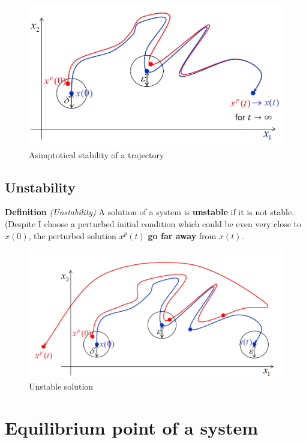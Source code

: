 \begin{figure}[h]
    \centering
    \includegraphics[scale=0.6]{NonLinearControl/images/AsStable.png}
    \caption{Asimptotical stability of a trajectory}
    \label{fig:enter-label}
\end{figure}

\subsection{Unstability}
\noindent
\textbf{Definition} \textit{(Unstability)} A solution of a system is \textbf{unstable} if it is not stable. (Despite I  choose a perturbed initial condition which could be even very close to $x(0)$, the perturbed solution $x^p(t)$ \textbf{go far away} from $x(t)$.

\begin{figure}[h]
    \centering
    \includegraphics[scale=0.6]{NonLinearControl/images/Unstable.png}
    \caption{Unstable solution}
    \label{fig:enter-label}
\end{figure}

\section{Equilibrium point of a system}

